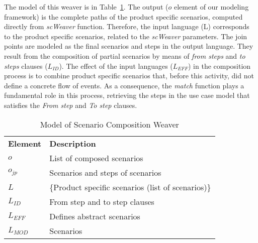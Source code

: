 %
%

The model of this weaver is in Table~\ref{tab:sc-weaver}. The output ($o$ element of our modeling framework) is the complete paths of the product specific scenarios, computed directly from \emph{scWeaver} function. Therefore, the input language (L) corresponds to the product specific scenarios, related to the \emph{scWeaver}
 parameters.
The join points are modeled as the final scenarios and steps in the output language. They result from the composition of partial scenarios by means of
\emph{from steps} and \emph{to steps} clauses ($L_{ID}$).
The effect of the input languages ($L_{EFF}$) in the composition process is to combine
product specific scenarios that, before this activity, did not define a concrete flow of events. As a consequence, the \emph{match} function
plays a fundamental role in this process, retrieving the steps in the use case model that satisfies the \emph{From step} and \emph{To step} clauses.

\begin{table}[hbt]
\begin{center}
\caption{Model of Scenario Composition Weaver} \label{tab:sc-weaver}
\begin{tabular}{p{0.4in}p{2.6in}}
   \hline\noalign{\smallskip}
  {\bf Element} & {\bf Description} \\
   \noalign{\smallskip}
   \hline
   \noalign{\smallskip}
   $o$               & List of composed scenarios  \\
   $o_{jp}$        & Scenarios and steps of scenarios \\
   $L$               & \{Product specific scenarios (list of scenarios)\} \\
   $L_{ID}$       & From step and to step clauses \\
   $L_{EFF}$    & Defines abstract scenarios  \\
   $L_{MOD}$  &  Scenarios \\
  \hline
  \end{tabular}
\end{center}
\end{table}


